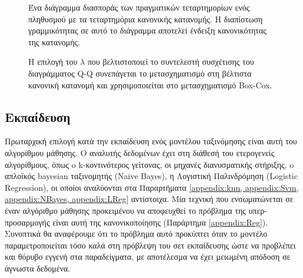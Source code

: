 	\begin{figure}[!htb]
		\begin{minipage}{0.45\textwidth}
	\caption[Διάγραμμα Quantile-Quantile]{Ένα διάγραμμα διασποράς των πραγματικών τεταρτημορίων ενός πληθυσμού με τα τεταρτημόρια κανονικής κατανομής. Η διαπίστωση γραμμικότητας σε αυτό το διάγραμμα αποτελεί ένδειξη κανονικότητας της κατανομής.}	
\end{minipage} \qquad
\begin{minipage}{0.45\textwidth}
	\caption[Επιλογή $\lambda$ Box-Cox μετασχηματισμού]{Η επιλογή του $\lambda$ που βελτιστοποιεί το συντελεστή συσχέτισης του διαγράμματος Q-Q συνεπάγεται το μετασχηματισμό στη βέλτιστα κανονική κατανομή και χρησιμοποιείται στο μετασχηματισμό Box-Cox.}

\end{minipage}
\end{figure}
	
\subsection{Εκπαίδευση}
Πρωταρχική επιλογή κατά την εκπαίδευση ενός μοντέλου ταξινόμησης είναι αυτή του αλγορίθμου μάθησης. Ο αναλυτής δεδομένων έχει στη διάθεσή του ετερογενείς αλγορίθμους, όπως o k-κοντινότερος γείτονας, οι μηχανές διανυσματικής στήριξης, o απλοϊκός bayesian ταξινομητής (Naive Bayes), η Λογιστική Παλινδρόμηση (Logistic Regression), οι οποίοι αναλύονται στα Παραρτήματα \ref{appendix:knn, appendix:Svm, appendix:NBayes, appendix:LReg} αντίστοιχα. Μία τεχνική που ενσωματώνεται σε έναν αλγόριθμο μάθησης προκειμένου να αποφευχθεί το πρόβλημα της υπερ-προσαρμογής είναι αυτή της κανονικοποίησης (Παράρτημα \ref{appendix:Reg}). Συνοπτικά θα αναφέρουμε ότι το πρόβλημα αυτό προκύπτει όταν το μοντέλο παραμετροποιείται τόσο καλά στη πρόβλεψη του σετ εκπαίδευσης ώστε να προβλέπει και θόρυβο εγγενή στα παραδείγματα, με αποτέλεσμα να έχει μειωμένη απόδοση σε άγνωστα δεδομένα.

